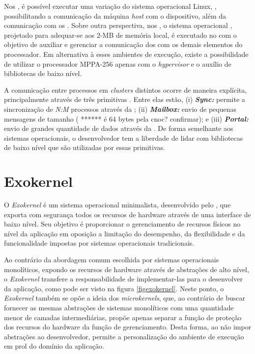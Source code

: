 \documentclass[
	12pt,				%
	openright,			%
	twoside,			%
	a4paper,			%
	english,			%
	brazil,				%
	]{abntex2}
\begin{document}
        Nos \ioclusters, é possível executar uma variação do sistema
        operacional Linux, \rtems, possibilitando a comunicação da
        máquina \textit{host} com o dispositivo, além da comunicação
        com os \cpclusters.
        Sobre outra perspectiva, nos \cpclusters, o sistema operacional
        \nodeos, projetado para adequar-se aos 2-MB de memória local, é executado no \rman com o objetivo de auxiliar e
        gerenciar a comunicação dos \pes com os demais elementos do processador.
        Em alternativa à esses ambientes de execução, existe a possibilidade
        de utilizar o processador MPPA-256 apenas com o \textit{hypervisor} 
        e o auxílio de bibliotecas de baixo nível.
        
        A comunicação entre processos em \textit{clusters} distintos ocorre
        de maneira explícita, principalmente  através de três primitivas \ipc.
        Entre elas estão,
        (i) \textbf{\textit{Sync:}} permite a sincronização de \textit{N:M} processos através da \cnoc;
        (ii) \textbf{\textit{Mailbox:}} envio de pequenas mensagens de tamanho ( ****** é 64 bytes pela cnoc? confirmar); e
        (iii) \textbf{\textit{Portal:}} envio de grandes quantidade de dados através da \dnoc.
        De forma semelhante aos sistemas operacionais, o desenvolvedor tem a
        liberdade de lidar com bibliotecas de baixo nível que são utilizadas
        por essas primitivas.
    
    \section{Exokernel}
    \label{sec:exokernel}
    
        O \textit{Exokernel} é um sistema operacional minimalista,
        desenvolvido pelo \unimit, que exporta com segurança todos os
        recursos de hardware através de uma interface de baixo nível.
        Seu objetivo é proporcionar o gerenciamento de recursos físicos
        no nível da aplicação em oposição a limitação do desempenho, da
        flexibilidade e da funcionalidade impostas por sistemas operacionais tradicionais.

        Ao contrário da abordagem comum escolhida por sistemas operacionais
        monolíticos, expondo os recursos de hardware através de abstrações
        de alto nível, o \textit{Exokernel} transfere a responsabilidade de
        implementar-las para o desenvolver da aplicação, como pode ser visto
        na figura \ref{figexokernel}.
        Neste ponto, o \textit{Exokernel} também se opõe a ideia dos 
        \textit{microkernels}, que, ao contrário de buscar fornecer as
        mesmas abstrações de sistemas monolíticos com uma quantidade menor
        de camadas intermediárias, propõe apenas separar a função de proteção
        dos recursos do hardware da função de gerenciamento.
        Desta forma, ao não impor abstrações ao desenvolvedor, permite a
        personalização do ambiente de execução em prol do domínio da aplicação.
        
\end{document}

